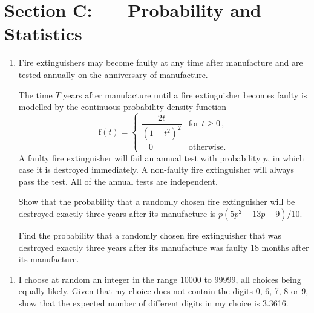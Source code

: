 \documentclass[a4, 11pt]{report}
\newlength{\qspace}
\newcounter{qnumber}
\newenvironment{question}%
 {\vspace{\qspace}
  \begin{enumerate}[\bfseries 1\quad][10]%
    \setcounter{enumi}{\value{qnumber}}%
    \item%
 }
{
  \end{enumerate}
  \filbreak
  \stepcounter{qnumber}
 }
\def\f{{\mathrm f}}
\def\ge{\geqslant}
\begin{document}
	
	\newpage
\section*{Section C: \ \ \ Probability and Statistics}


\begin{question}
Fire extinguishers may become faulty at any time
after  manufacture and 
are tested 
annually on the
 anniversary of  manufacture.

The time $T$ years after manufacture
 until a fire extinguisher
becomes faulty
 is modelled by the continuous
probability density function 
\[
\f(t) =
\begin{cases}
\dfrac{2t}{(1+t^2)^2}& \text{for $t\ge0$}\,,\\[4mm]
 \ \ \ \ 0& \text{otherwise}.
\end{cases}
\]
A faulty fire extinguisher will fail an annual test
with probability $p$, in which case it is destroyed immediately. A non-faulty
fire extinguisher will always pass the test. All of the annual tests
are independent.

Show that the probability 
that a randomly chosen fire extinguisher will be destroyed exactly
three years after its manufacture is $p(5p^2-13p +9)/10$. 

Find the probability that a randomly chosen
 fire extinguisher
that was destroyed exactly three years after its manufacture
was faulty 18 months after its manufacture.
\end{question}

\begin{question}
I choose at random an integer in the 
range 10000 to 99999, all choices being
equally likely. Given that my choice
does not contain the digits 0, 6, 7, 8 or 9,
show that the expected number of different digits
in my choice is 3.3616.
\end{question}
\end{document}
